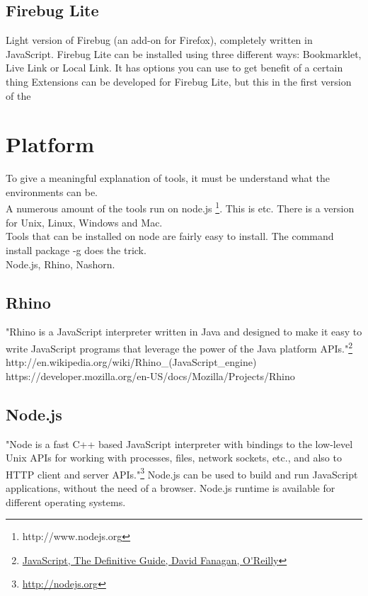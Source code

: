 \documentclass{article}
\begin{document}
\subsection {Firebug Lite}
Light version of Firebug (an add-on for Firefox), completely written in JavaScript.
Firebug Lite can be installed using three different ways: Bookmarklet, Live Link or Local Link.
It has options you can use to get benefit of a certain thing
Extensions can be developed for Firebug Lite, but this in the first version of the 

\section{Platform}
To give a meaningful explanation of tools, it must be understand what the environments can be.\\
A numerous amount of the tools run on node.js \footnote{http://www.nodejs.org}. This is etc.
There is a version for Unix, Linux, Windows and Mac.\\
Tools that can be installed on node are fairly easy to install. The command install package -g does the trick.\\
Node.js, Rhino, Nashorn.

\subsection{Rhino}
"Rhino is a JavaScript interpreter written in Java and designed to make it easy to write JavaScript programs 
that leverage the power of the Java platform APIs."\footnote{\url{JavaScript, The Definitive Guide, David Fanagan, O'Reilly}}\newline
http://en.wikipedia.org/wiki/Rhino\_(JavaScript\_engine)
https://developer.mozilla.org/en-US/docs/Mozilla/Projects/Rhino

\subsection{Node.js}
"Node is a fast C++ based JavaScript interpreter with bindings to the low-level 
Unix APIs for working with processes, files, network sockets, etc., and also to 
HTTP client and server APIs."\footnote{\url{http://nodejs.org}}
Node.js can be used to build and run JavaScript applications, without the need of a browser.
Node.js runtime is available for different operating systems.
\end{document}
